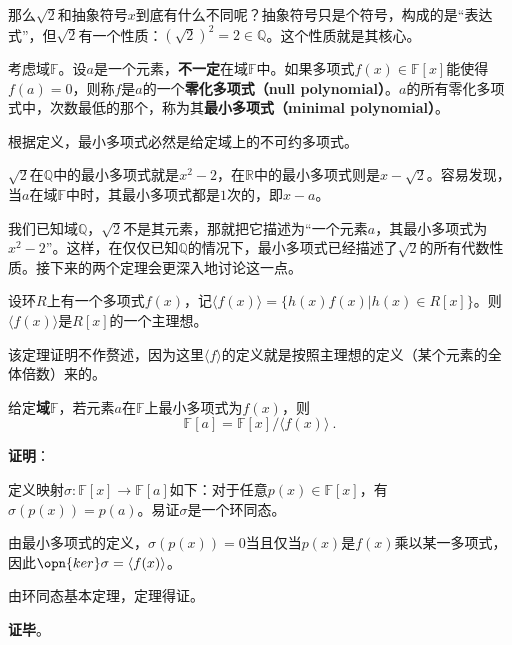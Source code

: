 那么$\sqrt{2}$和抽象符号$x$到底有什么不同呢？抽象符号只是个符号，构成的是“表达式”，但$\sqrt{2}$有一个性质：$(\sqrt{2})^2=2\in\mathbb{Q}$。这个性质就是其核心。

\begin{definition}{}
考虑域$\mathbb{F}$。设$a$是一个元素，\textbf{不一定}在域$\mathbb{F}$中。如果多项式$f(x)\in\mathbb{F}[x]$能使得$f(a)=0$，则称$f$是$a$的一个\textbf{零化多项式（null polynomial）}。$a$的所有零化多项式中，次数最低的那个，称为其\textbf{最小多项式（minimal polynomial）}。
\end{definition}

根据定义，最小多项式必然是给定域上的不可约多项式。



$\sqrt{2}$在$\mathbb{Q}$中的最小多项式就是$x^2-2$，在$\mathbb{R}$中的最小多项式则是$x-\sqrt{2}$。容易发现，当$a$在域$\mathbb{F}$中时，其最小多项式都是$1$次的，即$x-a$。

我们已知域$\mathbb{Q}$，$\sqrt{2}$不是其元素，那就把它描述为“一个元素$a$，其最小多项式为$x^2-2$”。这样，在仅仅已知$\mathbb{Q}$的情况下，最小多项式已经描述了$\sqrt{2}$的所有代数性质。接下来的两个定理会更深入地讨论这一点。



\begin{theorem}{}%

设环$R$上有一个多项式$f(x)$，记$\langle f(x) \rangle=\{h(x)f(x)|h(x)\in R[x]\}$。则$\langle f(x) \rangle$是$R[x]$的一个主理想。

\end{theorem}

该定理证明不作赘述，因为这里$\langle f \rangle$的定义就是按照主理想的定义（某个元素的全体倍数）来的。





\begin{theorem}{}\label{the_RPlynm_2}%

给定\textbf{域}$\mathbb{F}$，若元素$a$在$\mathbb{F}$上最小多项式为$f(x)$，则
\begin{equation}
\mathbb{F}[a]=\mathbb{F}[x]/\langle f(x) \rangle ~.
\end{equation}

\end{theorem}



\textbf{证明}：

定义映射$\sigma:\mathbb{F}[x]\to\mathbb{F}[a]$如下：对于任意$p(x)\in\mathbb{F}[x]$，有$\sigma(p(x))=p(a)$。易证$\sigma$是一个环同态。

由最小多项式的定义，$\sigma(p(x))=0$当且仅当$p(x)$是$f(x)$乘以某一多项式，因此$\opn{ker}\sigma = \langle f(x) \rangle$。

由环同态基本定理，定理得证。

\textbf{证毕}。












